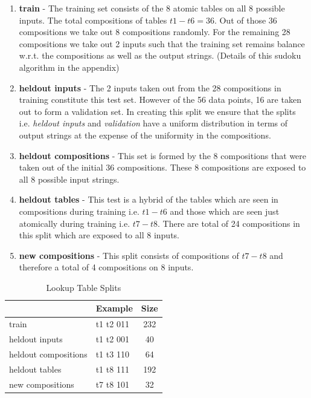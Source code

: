 \begin{enumerate}
	\item \textbf{train} - The training set consists of the 8 atomic tables on all 8 possible inputs. The total compositions of tables $t1 - t6 = 36$. Out of those 36 compositions we take out 8 compositions randomly. For the remaining 28 compositions we take out 2 inputs such that the training set remains balance w.r.t. the compositions as well as the output strings. (Details of this sudoku algorithm in the appendix)
	\item \textbf{heldout inputs} - The 2 inputs taken out from the 28 compositions in training constitute this test set. However of the 56 data points, 16 are taken out to form a validation set. In creating this split we ensure that the splits i.e. \textit{heldout inputs} and \textit{validation} have a uniform distribution in terms of output strings at the expense of the uniformity in the compositions.
	\item \textbf{heldout compositions} - This set is formed by the 8 compositions that were taken out of the initial 36 compositions. These 8 compositions are exposed to all 8 possible input strings.
	\item \textbf{heldout tables} - This test is a hybrid of the tables which are seen in compositions during training i.e. $t1 - t6$ and those which are seen just atomically during training i.e. $t7 - t8$. There are total of 24 compositions in this split which are exposed to all 8 inputs.
	\item \textbf{new compositions} - This split consists of compositions of $t7 - t8$ and therefore a total of 4 compositions on 8 inputs.
\end{enumerate}


\begin{table}[ht]
	\centering
	\begin{tabular}{l|lc}
		& Example & Size\\
		\hline
		train & t1 t2 011 & 232 \\
		heldout inputs & t1 t2 001 & 40 \\
		heldout compositions & t1 t3 110 & 64 \\
		heldout tables & t1 t8 111 & 192 \\
		new compositions & t7 t8 101 & 32 \\
	\end{tabular}
	\caption{Lookup Table Splits}
	\label{lt:stats}
\end{table}


